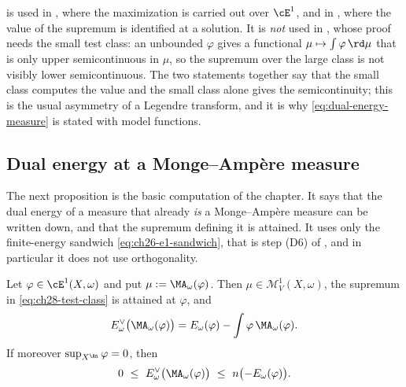 \begin{remark}
\label{rem:ch28-test-class-use}
 is used in
, where the maximization is carried out
over $\cE^1$, and in
, where the value of
the supremum is identified at a solution.  It is \emph{not} used in
, whose proof needs the small test class:
an unbounded $\varphi$ gives a functional $\mu\mapsto\int\varphi\,\rd\mu$
that is only upper semicontinuous in $\mu$, so the supremum over the large
class is not visibly lower semicontinuous.  The two statements together say
that the small class computes the value and the small class alone gives the
semicontinuity; this is the usual asymmetry of a Legendre transform, and it
is why \eqref{eq:dual-energy-measure} is stated with model functions.
\end{remark}

\subsection{Dual energy at a Monge--Amp\`ere measure}
\label{sec:ch28-dual-at-ma}

The next proposition is the basic computation of the chapter.  It says that
the dual energy of a measure that already \emph{is} a Monge--Amp\`ere
measure can be written down, and that the supremum defining it is attained.
It uses only the finite-energy sandwich \eqref{eq:ch26-e1-sandwich}, that is
step \textup{(D6)} of , and in particular it does
not use orthogonality.

\begin{proposition}
\label{prop:ch28-dual-energy-of-ma}
Let $\varphi\in\cE^1(X,\omega)$ and put $\mu:=\MA_\omega(\varphi)$.  Then
$\mu\in\mathcal M^1_V(X,\omega)$, the supremum in
\eqref{eq:ch28-test-class} is attained at $\varphi$, and
\begin{equation}
\label{eq:ch28-dual-energy-of-ma}
 E^\vee_\omega\bigl(\MA_\omega(\varphi)\bigr)
 =E_\omega(\varphi)-\int\varphi\,\MA_\omega(\varphi).
\end{equation}
If moreover $\sup_{X^{\An}}\varphi=0$, then
\begin{equation}
\label{eq:ch28-dual-energy-bracket}
 0\ \leq\ E^\vee_\omega\bigl(\MA_\omega(\varphi)\bigr)
 \ \leq\ n\bigl(-E_\omega(\varphi)\bigr).
\end{equation}
\end{proposition}

